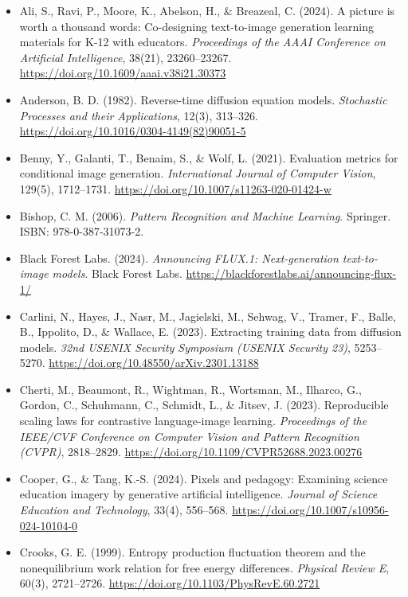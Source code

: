 \begin{itemize}[leftmargin=1.5em, label={}, itemsep=0.22ex, parsep=0pt]
\small\raggedright
{}
    \item Ali, S., Ravi, P., Moore, K., Abelson, H., \& Breazeal, C. (2024). A picture is worth a thousand words: Co-designing text-to-image generation learning materials for K-12 with educators. \textit{Proceedings of the AAAI Conference on Artificial Intelligence}, 38(21), 23260--23267. \url{https://doi.org/10.1609/aaai.v38i21.30373}
    \item Anderson, B. D. (1982). Reverse-time diffusion equation models. \textit{Stochastic Processes and their Applications}, 12(3), 313--326. \url{https://doi.org/10.1016/0304-4149(82)90051-5}
    \item Benny, Y., Galanti, T., Benaim, S., \& Wolf, L. (2021). Evaluation metrics for conditional image generation. \textit{International Journal of Computer Vision}, 129(5), 1712--1731. \url{https://doi.org/10.1007/s11263-020-01424-w}
    \item Bishop, C. M. (2006). \textit{Pattern Recognition and Machine Learning}. Springer. ISBN: 978-0-387-31073-2.
    \item Black Forest Labs. (2024). \textit{Announcing FLUX.1: Next-generation text-to-image models}. Black Forest Labs. \url{https://blackforestlabs.ai/announcing-flux-1/}
    \item Carlini, N., Hayes, J., Nasr, M., Jagielski, M., Sehwag, V., Tramer, F., Balle, B., Ippolito, D., \& Wallace, E. (2023). Extracting training data from diffusion models. \textit{32nd USENIX Security Symposium (USENIX Security 23)}, 5253--5270. \url{https://doi.org/10.48550/arXiv.2301.13188}
    \item Cherti, M., Beaumont, R., Wightman, R., Wortsman, M., Ilharco, G., Gordon, C., Schuhmann, C., Schmidt, L., \& Jitsev, J. (2023). Reproducible scaling laws for contrastive language-image learning. \textit{Proceedings of the IEEE/CVF Conference on Computer Vision and Pattern Recognition (CVPR)}, 2818--2829. \url{https://doi.org/10.1109/CVPR52688.2023.00276}
    \item Cooper, G., \& Tang, K.-S. (2024). Pixels and pedagogy: Examining science education imagery by generative artificial intelligence. \textit{Journal of Science Education and Technology}, 33(4), 556--568. \url{https://doi.org/10.1007/s10956-024-10104-0}
    \item Crooks, G. E. (1999). Entropy production fluctuation theorem and the nonequilibrium work relation for free energy differences. \textit{Physical Review E}, 60(3), 2721--2726. \url{https://doi.org/10.1103/PhysRevE.60.2721}

\end{itemize}
